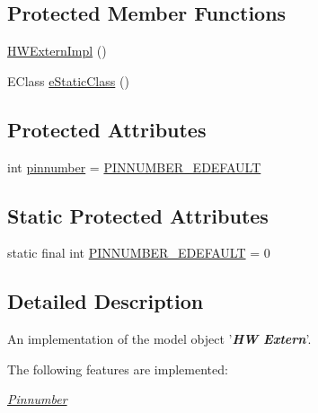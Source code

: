 \subsection*{Protected Member Functions}
\begin{DoxyCompactItemize}
\item 
\hyperlink{classshootingmachineemfmodel_1_1impl_1_1_h_w_extern_impl_af4b2efdd4fa7dd783307e05d57b246f5}{H\-W\-Extern\-Impl} ()
\item 
E\-Class \hyperlink{classshootingmachineemfmodel_1_1impl_1_1_h_w_extern_impl_a497b7dee4ca4bd3bdf94ddb1d0408b13}{e\-Static\-Class} ()
\end{DoxyCompactItemize}
\subsection*{Protected Attributes}
\begin{DoxyCompactItemize}
\item 
int \hyperlink{classshootingmachineemfmodel_1_1impl_1_1_h_w_extern_impl_a896c9b8ec13c8ff25f30612d112f892d}{pinnumber} = \hyperlink{classshootingmachineemfmodel_1_1impl_1_1_h_w_extern_impl_af4354e697c47eb82e78b978093aca7eb}{P\-I\-N\-N\-U\-M\-B\-E\-R\-\_\-\-E\-D\-E\-F\-A\-U\-L\-T}
\end{DoxyCompactItemize}
\subsection*{Static Protected Attributes}
\begin{DoxyCompactItemize}
\item 
static final int \hyperlink{classshootingmachineemfmodel_1_1impl_1_1_h_w_extern_impl_af4354e697c47eb82e78b978093aca7eb}{P\-I\-N\-N\-U\-M\-B\-E\-R\-\_\-\-E\-D\-E\-F\-A\-U\-L\-T} = 0
\end{DoxyCompactItemize}


\subsection{Detailed Description}
An implementation of the model object '{\itshape {\bfseries H\-W Extern}}'.

The following features are implemented\-: 
\begin{DoxyItemize}
\item \hyperlink{classshootingmachineemfmodel_1_1impl_1_1_h_w_extern_impl_a86c10c1bc44b1145a93323d6b4abff06}{{\itshape Pinnumber}} 
\end{DoxyItemize}

